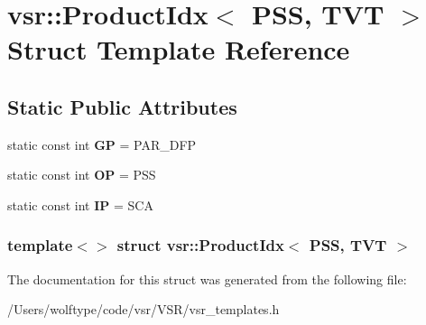 \hypertarget{structvsr_1_1_product_idx_3_01_p_s_s_00_01_t_v_t_01_4}{\section{vsr\-:\-:Product\-Idx$<$ P\-S\-S, T\-V\-T $>$ Struct Template Reference}
\label{structvsr_1_1_product_idx_3_01_p_s_s_00_01_t_v_t_01_4}
}
\subsection*{Static Public Attributes}
\begin{DoxyCompactItemize}
\item 
\hypertarget{structvsr_1_1_product_idx_3_01_p_s_s_00_01_t_v_t_01_4_aec6f0636e898091499219bcb0eb58c11}{static const int {\bfseries G\-P} = P\-A\-R\-\_\-\-D\-F\-P}\label{structvsr_1_1_product_idx_3_01_p_s_s_00_01_t_v_t_01_4_aec6f0636e898091499219bcb0eb58c11}

\item 
\hypertarget{structvsr_1_1_product_idx_3_01_p_s_s_00_01_t_v_t_01_4_a673fbb6b5e44e33cbe414ec8c8b45212}{static const int {\bfseries O\-P} = P\-S\-S}\label{structvsr_1_1_product_idx_3_01_p_s_s_00_01_t_v_t_01_4_a673fbb6b5e44e33cbe414ec8c8b45212}

\item 
\hypertarget{structvsr_1_1_product_idx_3_01_p_s_s_00_01_t_v_t_01_4_ad2f45b78dcc6231228540c5bb069027f}{static const int {\bfseries I\-P} = S\-C\-A}\label{structvsr_1_1_product_idx_3_01_p_s_s_00_01_t_v_t_01_4_ad2f45b78dcc6231228540c5bb069027f}

\end{DoxyCompactItemize}
\subsubsection*{template$<$$>$ struct vsr\-::\-Product\-Idx$<$ P\-S\-S, T\-V\-T $>$}



The documentation for this struct was generated from the following file\-:\begin{DoxyCompactItemize}
\item 
/\-Users/wolftype/code/vsr/\-V\-S\-R/vsr\-\_\-templates.\-h\end{DoxyCompactItemize}
